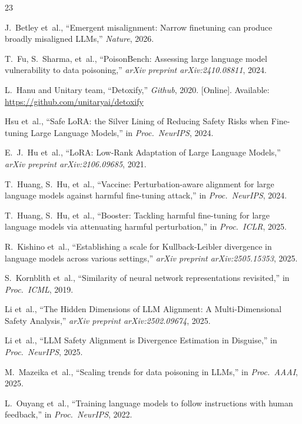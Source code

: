 \documentclass[conference]{IEEEtran}
\begin{document}
\begin{thebibliography}{23}

J.~Betley et~al.,
``Emergent misalignment: Narrow finetuning can produce broadly misaligned LLMs,''
\emph{Nature}, 2026.

T.~Fu, S.~Sharma, et~al.,
``PoisonBench: Assessing large language model vulnerability to data poisoning,''
\emph{arXiv preprint arXiv:2410.08811}, 2024.

L.~Hanu and Unitary team,
``Detoxify,''
\emph{Github}, 2020.
[Online]. Available: \url{https://github.com/unitaryai/detoxify}

Hsu et~al.,
``Safe {LoRA}: the Silver Lining of Reducing Safety Risks when Fine-tuning Large Language Models,''
in \emph{Proc.\ NeurIPS}, 2024.

E.~J.~Hu et~al.,
``LoRA: Low-Rank Adaptation of Large Language Models,''
\emph{arXiv preprint arXiv:2106.09685}, 2021.

T.~Huang, S.~Hu, et~al.,
``Vaccine: Perturbation-aware alignment for large language models against harmful fine-tuning attack,''
in \emph{Proc.\ NeurIPS}, 2024.

T.~Huang, S.~Hu, et~al.,
``Booster: Tackling harmful fine-tuning for large language models via attenuating harmful perturbation,''
in \emph{Proc.\ ICLR}, 2025.

R.~Kishino et~al.,
``Establishing a scale for {Kullback-Leibler} divergence in language models across various settings,''
\emph{arXiv preprint arXiv:2505.15353}, 2025.

S.~Kornblith et~al.,
``Similarity of neural network representations revisited,''
in \emph{Proc.\ ICML}, 2019.

Li et~al.,
``The Hidden Dimensions of {LLM} Alignment: A Multi-Dimensional Safety Analysis,''
\emph{arXiv preprint arXiv:2502.09674}, 2025.

Li et~al.,
``{LLM} Safety Alignment is Divergence Estimation in Disguise,''
in \emph{Proc.\ NeurIPS}, 2025.

M.~Mazeika et~al.,
``Scaling trends for data poisoning in {LLMs},''
in \emph{Proc.\ AAAI}, 2025.

L.~Ouyang et~al.,
``Training language models to follow instructions with human feedback,''
in \emph{Proc.\ NeurIPS}, 2022.


\end{thebibliography}
\end{document}
